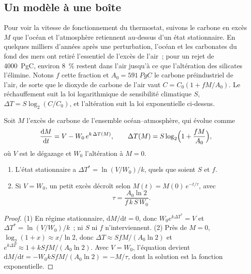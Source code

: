 \subsection*{Un modèle à une boîte}

Pour voir la vitesse de fonctionnement du thermostat, suivons le carbone en excès $M$ que l'océan et l'atmosphère
retiennent au-dessus d'un état stationnaire. En quelques milliers d'années après une perturbation, l'océan et les carbonates
du fond des mers ont retiré l'essentiel de l'excès de l'air~; pour un rejet de \qty{4000}{PgC}, environ
\qty{8}{\percent} restent dans l'air jusqu'à ce que l'altération des silicates l'élimine. Notons $f$ cette
fraction et $A_0 = \qty{591}{PgC}$ le carbone préindustriel de l'air, de sorte que le dioxyde de carbone de l'air
vaut $C = C_0(1 + fM/A_0)$. Le réchauffement suit la loi logarithmique de sensibilité climatique $S$,
$\Delta T = S\log_2(C/C_0)$, et l'altération suit la loi exponentielle ci-dessus.

\begin{proposition}\label{prop:b2:deep-time-climate:thermostat}
Soit $M$ l'excès de carbone de l'ensemble océan--atmosphère, qui évolue comme
\[
  \frac{\mathrm dM}{\mathrm dt} = V - W_0\,e^{k\,\Delta T(M)}, \qquad
  \Delta T(M) = S\log_2\Bigl(1 + \frac{fM}{A_0}\Bigr),
\]
où $V$ est le dégazage et $W_0$ l'altération à $M = 0$.
\begin{enumerate}
  \item L'état stationnaire a $\Delta T^* = \ln(V/W_0)/k$, quels que soient $S$ et $f$.
  \item Si $V = W_0$, un petit excès décroît selon $M(t) = M(0)\,e^{-t/\tau}$, avec
        \[
          \tau = \frac{A_0 \ln 2}{f\,k\,S\,W_0} .
        \]
\end{enumerate}
\end{proposition}

\begin{proof}
(1) En régime stationnaire, $\mathrm dM/\mathrm dt = 0$, donc $W_0e^{k\Delta T^*} = V$ et $\Delta T^* =
\ln(V/W_0)/k$~; ni $S$ ni $f$ n'interviennent. (2) Près de $M = 0$, $\log_2(1 + x) \approx x/\ln 2$, donc
$\Delta T \approx SfM/(A_0\ln 2)$ et $e^{k\Delta T} \approx 1 + kSfM/(A_0\ln2)$. Avec $V = W_0$, l'équation
devient $\mathrm dM/\mathrm dt = -W_0kSfM/(A_0\ln 2) = -M/\tau$, dont la solution est la
fonction exponentielle.
\end{proof}

